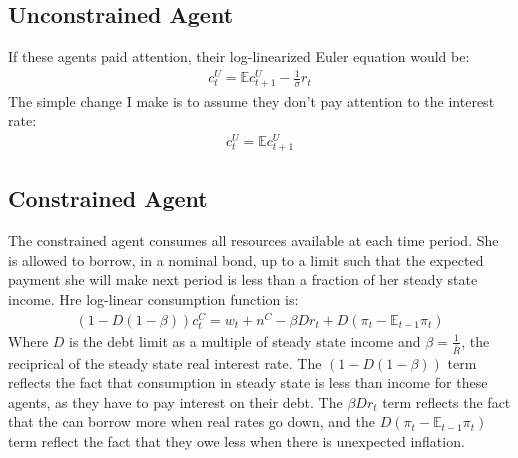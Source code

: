 \documentclass[AER]{AEA}
\begin{document}
\subsection{Unconstrained Agent}
If these agents paid attention, their log-linearized Euler equation would be:
\begin{align*}
c^U_t = \mathbb{E} c^U_{t+1} - \frac{1}{\sigma} r_t
\end{align*}
The simple change I make is to assume they don't pay attention to the interest rate:
\begin{align*}
c^U_t = \mathbb{E} c^U_{t+1}
\end{align*}
\subsection{Constrained Agent}
The constrained agent consumes all resources available at each time period. She is allowed to borrow, in a nominal bond, up to a limit such that the expected payment she will make next period is less than a fraction of her steady state income. Hre log-linear consumption function is:
\begin{align*}
(1-D(1-\beta))c^C_t = w_t + n^C - \beta D r_t + D( \pi_t - \mathbb{E}_{t-1}\pi_t)
\end{align*}
Where $D$ is the debt limit as a multiple of steady state income and $\beta= \frac{1}{\bar{R}}$, the reciprical of the steady state real interest rate. The $(1-D(1-\beta))$ term reflects the fact that consumption in steady state is less than income for these agents, as they have to pay interest on their debt. The $\beta D r_t$ term reflects the fact that the can borrow more when real rates go down, and the $ D( \pi_t - \mathbb{E}_{t-1}\pi_t)$ term reflect the fact that they owe less when there is unexpected inflation.
\end{document}
